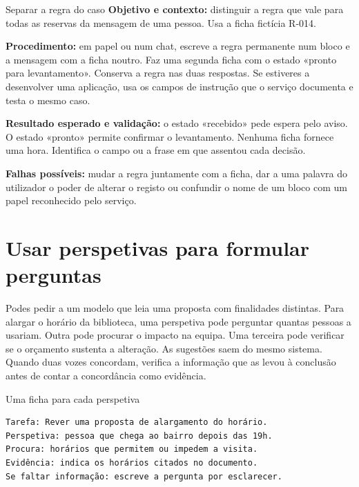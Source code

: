 \begin{promptlabbox}{Separar a regra do caso}
\textbf{Objetivo e contexto:} distinguir a regra que vale para todas as reservas da mensagem de uma pessoa. Usa a ficha fictícia R-014.

\textbf{Procedimento:} em papel ou num chat, escreve a regra permanente num bloco e a mensagem com a ficha noutro. Faz uma segunda ficha com o estado «pronto para levantamento». Conserva a regra nas duas respostas. Se estiveres a desenvolver uma aplicação, usa os campos de instrução que o serviço documenta e testa o mesmo caso.

\textbf{Resultado esperado e validação:} o estado «recebido» pede espera pelo aviso. O estado «pronto» permite confirmar o levantamento. Nenhuma ficha fornece uma hora. Identifica o campo ou a frase em que assentou cada decisão.

\textbf{Falhas possíveis:} mudar a regra juntamente com a ficha, dar a uma palavra do utilizador o poder de alterar o registo ou confundir o nome de um bloco com um papel reconhecido pelo serviço.
\end{promptlabbox}

\section{Usar perspetivas para formular perguntas}

Podes pedir a um modelo que leia uma proposta com finalidades distintas. Para alargar o horário da biblioteca, uma perspetiva pode perguntar quantas pessoas a usariam. Outra pode procurar o impacto na equipa. Uma terceira pode verificar se o orçamento sustenta a alteração. As sugestões saem do mesmo sistema. Quando duas vozes concordam, verifica a informação que as levou à conclusão antes de contar a concordância como evidência.

\begin{godmodebox}{Uma ficha para cada perspetiva}
\begin{lstlisting}
Tarefa: Rever uma proposta de alargamento do horário.
Perspetiva: pessoa que chega ao bairro depois das 19h.
Procura: horários que permitem ou impedem a visita.
Evidência: indica os horários citados no documento.
Se faltar informação: escreve a pergunta por esclarecer.
\end{lstlisting}
\end{godmodebox}

